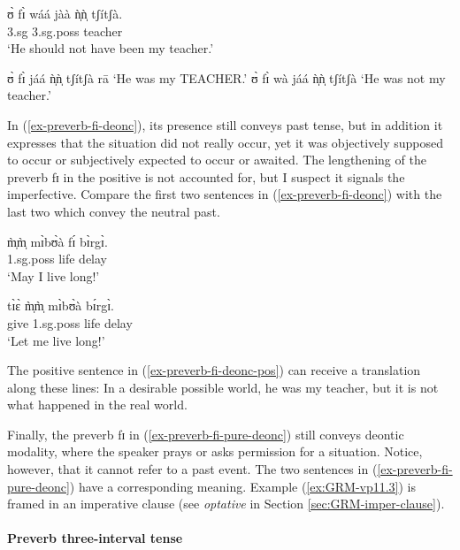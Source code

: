 \begin{exe}
\begin{exe}
\begin{exe}
{\begin{exe}
\begin{exe}
\begin{exe}
\begin{exe}
\begin{exe}
\begin{exe}
\begin{exe}
\begin{exe}
\begin{exe}
\begin{exe}
\begin{exe}
\begin{exe}
\begin{exe}
\begin{exe}
\begin{exe}
\begin{exe}
\begin{exe}
\begin{exe}
\begin{exe}
\begin{exe}
\ex
\gll ʊ̀ fɪ̀ wáá jàà  ǹ̩ǹ̩ tʃítʃà.\\
  {\sc 3.sg} {\mod} {\neg} {\ident} {\sc 3.sg.poss}  teacher\\  
\glt   `He should not have been my teacher.'  


\ex
 ʊ̀  fɪ̀ jáá  ǹ̩ǹ̩ tʃítʃà  rā  {\rm `He was my TEACHER.'}
\ex
 ʊ̀  fɪ̀ wà jáá  ǹ̩ǹ̩ tʃítʃà {\rm `He was not my teacher.'}

\z 
 \z 


In (\ref{ex-preverb-fi-deonc}),  its presence still conveys  past
tense, but in addition it expresses that the situation did not really occur, yet
it was objectively supposed to occur or subjectively expected to occur or
awaited. The lengthening of the preverb {\sls fɪ} in the positive  is not
accounted for, but I suspect it  signals the imperfective. 
Compare the first two
sentences in (\ref{ex-preverb-fi-deonc}) with the last two  which convey the
neutral past. 

\ea\label{ex-preverb-fi-pure-deonc}

\ea\label{ex:GRM-vp11.2}
\gll m̩̀m̩̀ mɪ̀bʊ̀à fɪ́  bɪ̀rgɪ̀.\\
 {\sc 1.sg.poss} life {\mod}  delay\\
\glt  `May I live long!' 

\ex\label{ex:GRM-vp11.3}
\gll tɪ̀ɛ̀ m̩̀m̩̀ mɪ̀bʊ̀à bɪ́rgɪ̀.\\
   give {\sc 1.sg.poss} life delay\\
\glt  `Let me live long!' 

\z 
 \z 



The positive sentence in (\ref{ex-preverb-fi-deonc-pos}) can receive  a
translation along these lines:  In a desirable possible world, he was my
teacher, but it is not what happened in
the real world. 


Finally, the preverb {\sls fɪ}  in (\ref{ex-preverb-fi-pure-deonc}) still 
conveys
 deontic modality, where the speaker prays or asks permission for a 
situation. Notice, however,  that it cannot refer to a past event. The two
sentences
in (\ref{ex-preverb-fi-pure-deonc}) have a corresponding meaning. Example
(\ref{ex:GRM-vp11.3}) is framed in an imperative clause (see  {\it 
optative} in 
Section
\ref{sec:GRM-imper-clause}). 


\paragraph{Preverb three-interval tense}
\label{sec:GRM-preverb-three-int-tense}


\end{exe}
\end{exe}
\end{exe}
\end{exe}
\end{exe}
\end{exe}
\end{exe}
\end{exe}
\end{exe}
\end{exe}
\end{exe}
\end{exe}
\end{exe}
\end{exe}
\end{exe}
\end{exe}
\end{exe}
\end{exe}
\end{exe}
\end{exe}}
\end{exe}
\end{exe}
\end{exe}
